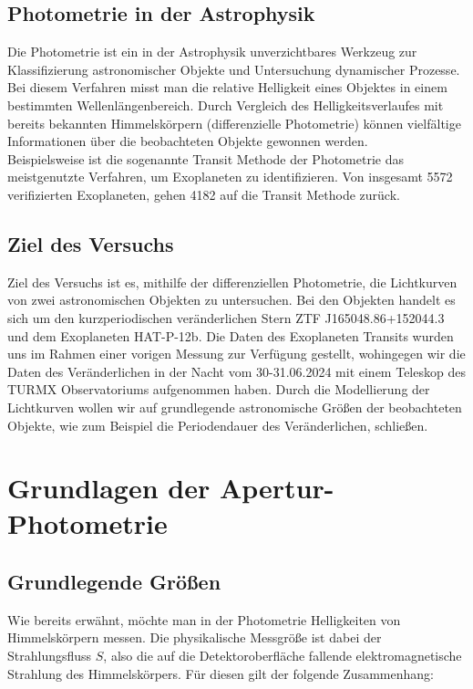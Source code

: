 \documentclass[ngerman,ruledheaders=section,class=report,thesis={type=Protokoll},accentcolor=1b,marginpar=false,parskip=half-,fontsize=11pt,]{tudapub}
\begin{document}
	\section{Photometrie in der Astrophysik}
	Die Photometrie ist ein in der Astrophysik unverzichtbares Werkzeug zur Klassifizierung astronomischer Objekte und Untersuchung dynamischer Prozesse. Bei diesem Verfahren misst man die relative Helligkeit eines Objektes in einem bestimmten Wellenlängenbereich. Durch Vergleich des Helligkeitsverlaufes mit bereits bekannten Himmelskörpern (differenzielle Photometrie) können vielfältige Informationen über die beobachteten Objekte gewonnen werden. \\
	Beispielsweise ist die sogenannte Transit Methode der Photometrie das meistgenutzte Verfahren, um Exoplaneten zu identifizieren. Von insgesamt 5572 verifizierten Exoplaneten, gehen 4182 auf die Transit Methode zurück. \cite{NasaExo} \\ 
	
	
	\section{Ziel des Versuchs}
	Ziel des Versuchs ist es, mithilfe der differenziellen Photometrie, die Lichtkurven von zwei astronomischen Objekten zu untersuchen. Bei den Objekten handelt es sich um den kurzperiodischen veränderlichen Stern  ZTF J165048.86+152044.3 und dem Exoplaneten HAT-P-12b. Die Daten des Exoplaneten Transits wurden uns im Rahmen einer vorigen Messung zur Verfügung gestellt, wohingegen wir die Daten des Veränderlichen in der Nacht vom 30-31.06.2024 mit einem Teleskop des TURMX Observatoriums aufgenommen haben. Durch die Modellierung der Lichtkurven wollen wir auf grundlegende astronomische Größen der beobachteten Objekte, wie zum Beispiel die Periodendauer des Veränderlichen, schließen.
	
	
	\chapter{Grundlagen der Apertur-Photometrie}
	\section{Grundlegende Größen}
	Wie bereits erwähnt, möchte man in der Photometrie Helligkeiten von Himmelskörpern messen. Die physikalische Messgröße ist dabei der Strahlungsfluss $S$, also die auf die Detektoroberfläche fallende elektromagnetische Strahlung des Himmelskörpers. Für diesen gilt der folgende Zusammenhang:
	
\end{document}
